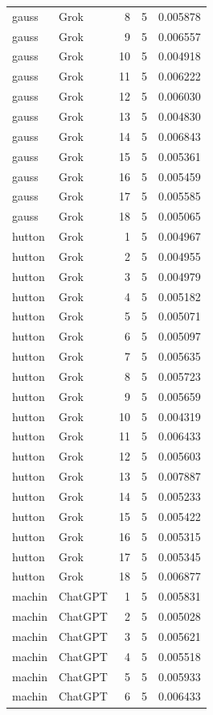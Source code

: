 \begin{longtable}{llrrr}
gauss & Grok & 8 & 5 & 0.005878\\
gauss & Grok & 9 & 5 & 0.006557\\
gauss & Grok & 10 & 5 & 0.004918\\
gauss & Grok & 11 & 5 & 0.006222\\
gauss & Grok & 12 & 5 & 0.006030\\
gauss & Grok & 13 & 5 & 0.004830\\
gauss & Grok & 14 & 5 & 0.006843\\
gauss & Grok & 15 & 5 & 0.005361\\
gauss & Grok & 16 & 5 & 0.005459\\
gauss & Grok & 17 & 5 & 0.005585\\
gauss & Grok & 18 & 5 & 0.005065\\
hutton & Grok & 1 & 5 & 0.004967\\
hutton & Grok & 2 & 5 & 0.004955\\
hutton & Grok & 3 & 5 & 0.004979\\
hutton & Grok & 4 & 5 & 0.005182\\
hutton & Grok & 5 & 5 & 0.005071\\
hutton & Grok & 6 & 5 & 0.005097\\
hutton & Grok & 7 & 5 & 0.005635\\
hutton & Grok & 8 & 5 & 0.005723\\
hutton & Grok & 9 & 5 & 0.005659\\
hutton & Grok & 10 & 5 & 0.004319\\
hutton & Grok & 11 & 5 & 0.006433\\
hutton & Grok & 12 & 5 & 0.005603\\
hutton & Grok & 13 & 5 & 0.007887\\
hutton & Grok & 14 & 5 & 0.005233\\
hutton & Grok & 15 & 5 & 0.005422\\
hutton & Grok & 16 & 5 & 0.005315\\
hutton & Grok & 17 & 5 & 0.005345\\
hutton & Grok & 18 & 5 & 0.006877\\
machin & ChatGPT & 1 & 5 & 0.005831\\
machin & ChatGPT & 2 & 5 & 0.005028\\
machin & ChatGPT & 3 & 5 & 0.005621\\
machin & ChatGPT & 4 & 5 & 0.005518\\
machin & ChatGPT & 5 & 5 & 0.005933\\
machin & ChatGPT & 6 & 5 & 0.006433\\

\end{longtable}
